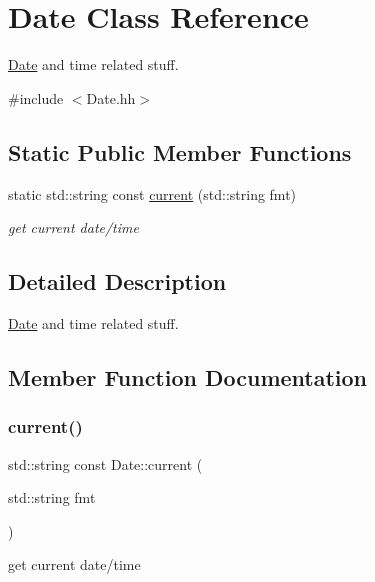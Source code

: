 \hypertarget{classDate}{}\section{Date Class Reference}
\label{classDate}


\hyperlink{classDate}{Date} and time related stuff.  




{\ttfamily \#include $<$Date.\+hh$>$}

\subsection*{Static Public Member Functions}
\begin{DoxyCompactItemize}
\item 
static std\+::string const \hyperlink{classDate_a49fb653adf893d1480edd57200f77eea}{current} (std\+::string fmt)
\begin{DoxyCompactList}\small\item\em get current date/time \end{DoxyCompactList}\end{DoxyCompactItemize}


\subsection{Detailed Description}
\hyperlink{classDate}{Date} and time related stuff. 

\subsection{Member Function Documentation}
\mbox{\label{classDate_a49fb653adf893d1480edd57200f77eea}} 
\subsubsection{\texorpdfstring{current()}{current()}}
{\footnotesize\ttfamily std\+::string const Date\+::current (\begin{DoxyParamCaption}\item[{std\+::string}]{fmt }\end{DoxyParamCaption})\hspace{0.3cm}{\ttfamily [static]}}



get current date/time 


